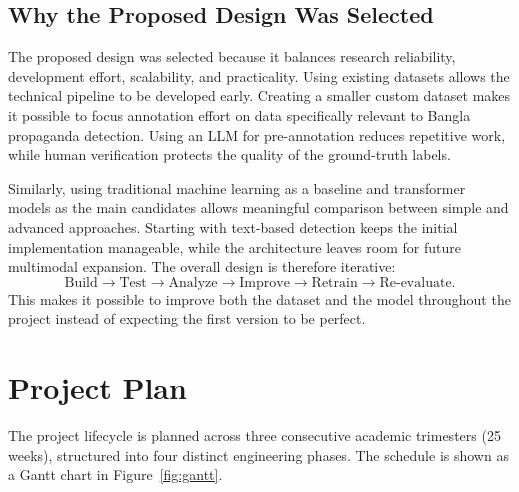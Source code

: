 \documentclass[12pt,a4paper]{report}
\begin{document}
\subsection{Why the Proposed Design Was Selected}
The proposed design was selected because it balances research reliability,
development effort, scalability, and practicality. Using existing datasets allows
the technical pipeline to be developed early. Creating a smaller custom dataset
makes it possible to focus annotation effort on data specifically relevant to
Bangla propaganda detection. Using an LLM for pre-annotation reduces repetitive
work, while human verification protects the quality of the ground-truth labels.

Similarly, using traditional machine learning as a baseline and transformer models
as the main candidates allows meaningful comparison between simple and advanced
approaches. Starting with text-based detection keeps the initial implementation
manageable, while the architecture leaves room for future multimodal expansion.
The overall design is therefore iterative:
\[\text{Build}\rightarrow\text{Test}\rightarrow\text{Analyze}\rightarrow\text{Improve}\rightarrow\text{Retrain}\rightarrow\text{Re-evaluate}.\]
This makes it possible to improve both the dataset and the model throughout the
project instead of expecting the first version to be perfect.

\section{Project Plan}
\label{sec:plan}
The project lifecycle is planned across three consecutive academic trimesters
(25 weeks), structured into four distinct engineering phases. The schedule is shown
as a Gantt chart in Figure~\ref{fig:gantt}.
\end{document}
